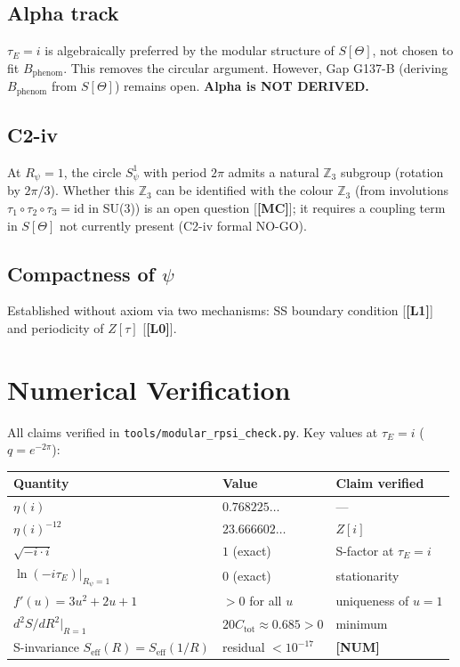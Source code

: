 \documentclass[12pt,a4paper]{article}
\theoremstyle{definition}\newtheorem{definition}[theorem]{Definition}
\theoremstyle{remark}\newtheorem{remark}[theorem]{Remark}
\newcommand{\Lz}{\textbf{[L0]}}
\newcommand{\Lo}{\textbf{[L1]}}
\newcommand{\MC}{\textbf{[MC]}}
\newcommand{\NUM}{\textbf{[NUM]}}
\newcommand{\ZZ}{\mathbb{Z}}
\begin{document}
\subsection*{Alpha track}
$\tau_E=i$ is algebraically preferred by the modular structure of
$S[\Theta]$, not chosen to fit $B_{\mathrm{phenom}}$.  This removes
the circular argument.  However, Gap G137-B (deriving $B_{\mathrm{phenom}}$
from $S[\Theta]$) remains open.  \textbf{Alpha is NOT DERIVED.}

\subsection*{C2-iv}
At $R_\psi=1$, the circle $S^1_\psi$ with period $2\pi$ admits a
natural $\ZZ_3$ subgroup (rotation by $2\pi/3$).  Whether this
$\ZZ_3$ can be identified with the colour $\ZZ_3$ (from involutions
$\tau_1\circ\tau_2\circ\tau_3=\mathrm{id}$ in SU(3)) is an open
question [\MC]; it requires a coupling term in $S[\Theta]$ not
currently present (C2-iv formal NO-GO).

\subsection*{Compactness of $\psi$}
Established without axiom via two mechanisms: SS boundary condition
[\Lo] and periodicity of $Z[\tau]$ [\Lz].

\section{Numerical Verification}
\label{sec:numerical}

All claims verified in \texttt{tools/modular\_rpsi\_check.py}.
Key values at $\tau_E=i$ ($q=e^{-2\pi}$):

\begin{center}
\begin{tabular}{lll}
\toprule
Quantity & Value & Claim verified \\
\midrule
$\eta(i)$ & $0.768225\ldots$ & — \\
$\eta(i)^{-12}$ & $23.666602\ldots$ & $Z[i]$ \\
$\sqrt{-i\cdot i}$ & $1$ (exact) & S-factor at $\tau_E=i$ \\
$\ln(-i\tau_E)|_{R_\psi=1}$ & $0$ (exact) & stationarity \\
$f'(u)=3u^2+2u+1$ & $>0$ for all $u$ & uniqueness of $u=1$ \\
$d^2S/dR^2|_{R=1}$ & $20C_{\mathrm{tot}}\approx0.685>0$ & minimum \\
S-invariance $S_{\mathrm{eff}}(R)=S_{\mathrm{eff}}(1/R)$ &
  residual $<10^{-17}$ & \NUM \\
\bottomrule
\end{tabular}
\end{center}
\end{document}
